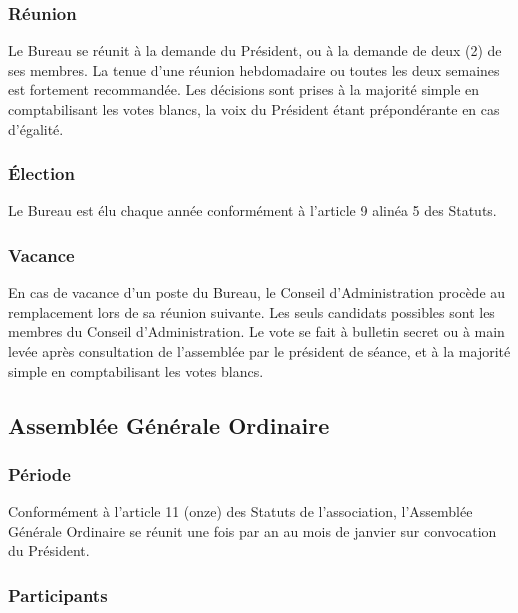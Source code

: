 \documentclass[12pt]{article}
\begin{document}
\subsubsection{Réunion}
\label{sec:entites_decisionnelles:bureau:reunion}

Le Bureau se réunit à la demande du Président, ou à la demande de deux (2) de ses membres.
La tenue d’une réunion hebdomadaire ou toutes les deux semaines est fortement recommandée.
Les décisions sont prises à la majorité simple en comptabilisant les votes blancs, la voix du Président étant
prépondérante en cas d’égalité.

\subsubsection{Élection}
\label{sec:entites_decisionnelles:bureau:election}

Le Bureau est élu chaque année conformément à l’article 9 alinéa 5 des Statuts.

\subsubsection{Vacance}
\label{sec:entites_decisionnelles:bureau:vacance}

En cas de vacance d’un poste du Bureau, le Conseil d’Administration procède au remplacement lors de sa
réunion suivante.
Les seuls candidats possibles sont les membres du Conseil d’Administration.
Le vote se fait à bulletin secret ou à main levée après consultation de l’assemblée par le président de séance,
et à la majorité simple en comptabilisant les votes blancs.




\subsection{Assemblée Générale Ordinaire}
\label{sec:entites_decisionnelles:ago}

\subsubsection{Période}
\label{sec:entites_decisionnelles:ago:periode}

Conformément à l’article 11 (onze) des Statuts de l’association, l’Assemblée Générale Ordinaire se réunit une
fois par an au mois de janvier sur convocation du Président.

\subsubsection{Participants}
\label{sec:entites_decisionnelles:ago:participants}
\end{document}
